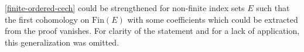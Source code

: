 \ref{finite-ordered-cech} could be strengthened for non-finite index sets $E$
such that the first cohomology on $\mathrm{Fin}(E)$ with some coefficients which could be extracted from the proof vanishes.
For clarity of the statement and for a lack of application, this generalization was omitted.